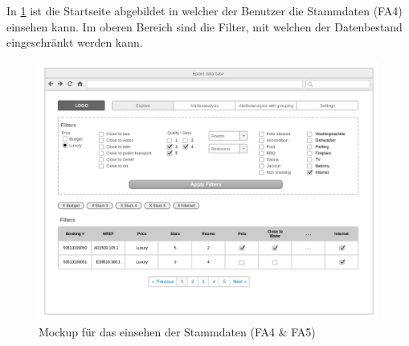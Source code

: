 In \cref{fig:konzept:mockups:stammdaten} ist die Startseite abgebildet in welcher der Benutzer die Stammdaten (FA4) einsehen kann. Im oberen Bereich sind die Filter, mit welchen der Datenbestand eingeschränkt werden kann. 
\begin{figure}[H]
	\RawFloats
	\centering
	\includegraphics[width=1\textwidth]{images/wireframe-explore}
	\caption{Mockup für das einsehen der Stammdaten (FA4 \& FA5)}
	\label{fig:konzept:mockups:stammdaten}
\end{figure}

